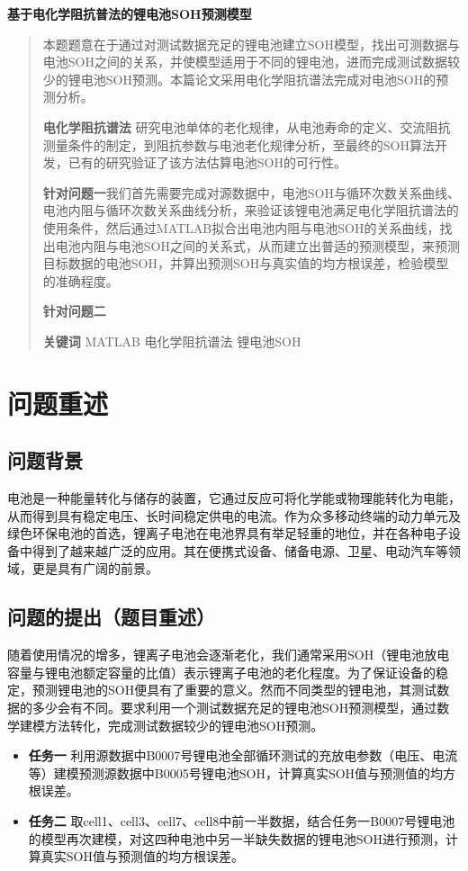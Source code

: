 \documentclass{cumcm}
\begin{document}
\begin{minipage}{0.9\textwidth}
\centering\LARGE\textbf{基于电化学阻抗普法的锂电池SOH预测模型}
\end{minipage}
\begin{abstract}
本题题意在于通过对测试数据充足的锂电池建立SOH模型，找出可测数据与电池SOH之间的关系，并使模型适用于不同的锂电池，进而完成测试数据较少的锂电池SOH预测。本篇论文采用电化学阻抗谱法完成对电池SOH的预测分析。\par
\textbf{电化学阻抗谱法} \quad 研究电池单体的老化规律，从电池寿命的定义、交流阻抗测量条件的制定，到阻抗参数与电池老化规律分析，至最终的SOH算法开发，已有的研究验证了该方法估算电池SOH的可行性。\par
\textbf{针对问题一}\quad 我们首先需要完成对源数据中，电池SOH与循环次数关系曲线、电池内阻与循环次数关系曲线分析，来验证该锂电池满足电化学阻抗谱法的使用条件，然后通过MATLAB拟合出电池内阻与电池SOH的关系曲线，找出电池内阻与电池SOH之间的关系式，从而建立出普适的预测模型，来预测目标数据的电池SOH，并算出预测SOH与真实值的均方根误差，检验模型的准确程度。\par
\textbf{针对问题二} \quad \par
\textbf{关键词} \quad MATLAB \quad 电化学阻抗谱法  \quad 锂电池SOH
\end{abstract}

\newpage
\section{问题重述}
\subsection{问题背景}
电池是一种能量转化与储存的装置，它通过反应可将化学能或物理能转化为电能，从而得到具有稳定电压、长时间稳定供电的电流。作为众多移动终端的动力单元及绿色环保电池的首选，锂离子电池在电池界具有举足轻重的地位，并在各种电子设备中得到了越来越广泛的应用。其在便携式设备、储备电源、卫星、电动汽车等领域，更是具有广阔的前景。
\subsection{问题的提出（题目重述）}
随着使用情况的增多，锂离子电池会逐渐老化，我们通常采用SOH（锂电池放电容量与锂电池额定容量的比值）表示锂离子电池的老化程度。为了保证设备的稳定，预测锂电池的SOH便具有了重要的意义。然而不同类型的锂电池，其测试数据的多少会有不同。要求利用一个测试数据充足的锂电池SOH预测模型，通过数学建模方法转化，完成测试数据较少的锂电池SOH预测。

\begin{itemize}
\item \textbf{任务一} \quad 利用源数据中B0007号锂电池全部循环测试的充放电参数（电压、电流等）建模预测源数据中B0005号锂电池SOH，计算真实SOH值与预测值的均方根误差。
\item \textbf{任务二} \quad 取cell1、cell3、cell7、cell8中前一半数据，结合任务一B0007号锂电池的模型再次建模，对这四种电池中另一半缺失数据的锂电池SOH进行预测，计算真实SOH值与预测值的均方根误差。
\end{itemize}
\end{document}

